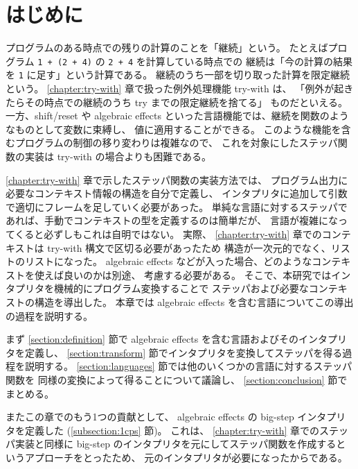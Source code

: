 \section{はじめに}
\label{section:algebraic effects__intro}

プログラムのある時点での残りの計算のことを「継続」という。
たとえばプログラム \texttt{1 + (2 + 4)} の \texttt{2 + 4} を計算している時点での
継続は「今の計算の結果を \texttt{1} に足す」という計算である。
継続のうち一部を切り取った計算を限定継続という。
\ref{chapter:try-with} 章で扱った例外処理機能 try-with は、
「例外が起きたらその時点での継続のうち try までの限定継続を捨てる」
ものだといえる。
一方、shift/reset \cite{DF1990} や algebraic effects \cite{PRETNAR201519}
といった言語機能では、継続を関数のようなものとして変数に束縛し、
値に適用することができる。
このような機能を含むプログラムの制御の移り変わりは複雑なので、
これを対象にしたステッパ関数の実装は try-with の場合よりも困難である。

\ref{chapter:try-with} 章で示したステッパ関数の実装方法では、
プログラム出力に必要なコンテキスト情報の構造を自分で定義し、
インタプリタに追加して引数で適切にフレームを足していく必要があった。
単純な言語に対するステッパであれば、手動でコンテキストの型を定義するのは簡単だが、
言語が複雑になってくると必ずしもこれは自明ではない。
実際、 \ref{chapter:try-with} 章でのコンテキストは try-with 構文で区切る必要があったため
構造が一次元的でなく、リストのリストになった。
algebraic effects などが入った場合、どのようなコンテキストを使えば良いのかは別途、
考慮する必要がある。
そこで、本研究ではインタプリタを機械的にプログラム変換することで
ステッパおよび必要なコンテキストの構造を導出した。
本章では algebraic effects を含む言語についてこの導出の過程を説明する。

まず \ref{section:definition} 節で algebraic effects を含む言語およびそのインタプリタを定義し、
\ref{section:transform} 節でインタプリタを変換してステッパを得る過程を説明する。
\ref{section:languages} 節では他のいくつかの言語に対するステッパ関数を
同様の変換によって得ることについて議論し、
\ref{section:conclusion} 節でまとめる。

またこの章でのもう1つの貢献として、
algebraic effects の big-step インタプリタを定義した (\ref{subsection:1cps} 節)。
これは、 \ref{chapter:try-with} 章でのステッパ実装と同様に
big-step のインタプリタを元にしてステッパ関数を作成するというアプローチをとったため、
元のインタプリタが必要になったからである。
